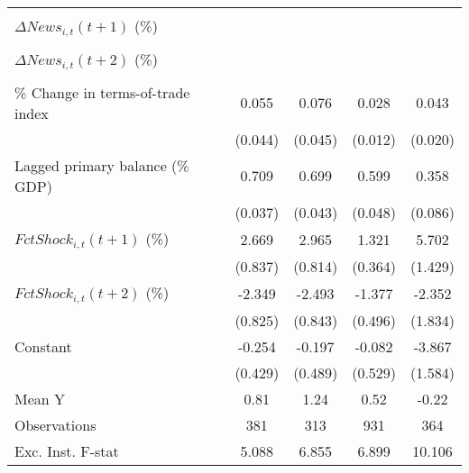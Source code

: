 {\begin{tabular}{l*{4}{c}}
                    &                     &                     &                     &                     \\
\addlinespace
$ \Delta News_{i,t}(t+1)$ (\%)&                     &                     &                     &                     \\
                    &                     &                     &                     &                     \\
\addlinespace
$ \Delta News_{i,t}(t+2)$ (\%)&                     &                     &                     &                     \\
                    &                     &                     &                     &                     \\
\addlinespace
\% Change in terms-of-trade index&       0.055         &       0.076         &       0.028\sym{**} &       0.043\sym{**} \\
                    &     (0.044)         &     (0.045)         &     (0.012)         &     (0.020)         \\
\addlinespace
Lagged primary balance (\% GDP)&       0.709\sym{***}&       0.699\sym{***}&       0.599\sym{***}&       0.358\sym{***}\\
                    &     (0.037)         &     (0.043)         &     (0.048)         &     (0.086)         \\
\addlinespace
$ FctShock_{i,t}(t+1)$ (\%)&       2.669\sym{***}&       2.965\sym{***}&       1.321\sym{***}&       5.702\sym{***}\\
                    &     (0.837)         &     (0.814)         &     (0.364)         &     (1.429)         \\
\addlinespace
$ FctShock_{i,t}(t+2)$ (\%)&      -2.349\sym{***}&      -2.493\sym{***}&      -1.377\sym{***}&      -2.352         \\
                    &     (0.825)         &     (0.843)         &     (0.496)         &     (1.834)         \\
\addlinespace
Constant            &      -0.254         &      -0.197         &      -0.082         &      -3.867\sym{**} \\
                    &     (0.429)         &     (0.489)         &     (0.529)         &     (1.584)         \\
\midrule
Mean Y              &        0.81         &        1.24         &        0.52         &       -0.22         \\
Observations        &         381         &         313         &         931         &         364         \\
Exc. Inst. F-stat   &       5.088         &       6.855         &       6.899         &      10.106         \\
\bottomrule
\end{tabular}
}
